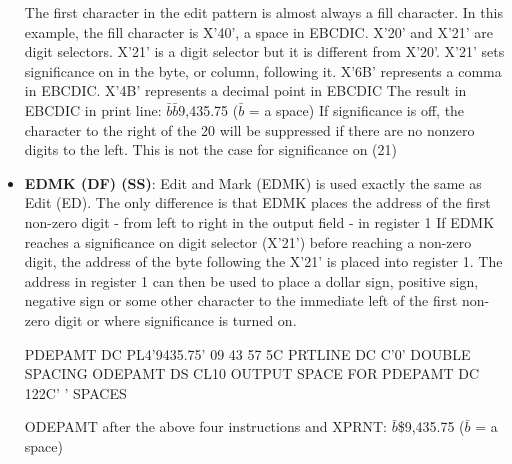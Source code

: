 \documentclass{report}
\begin{document}
\begin{itemize}
            \bigbreak \noindent 
            The first character in the edit pattern is almost always a fill character.
            \bigbreak \noindent 
            In this example, the fill character is X'40', a space in EBCDIC.
            \bigbreak \noindent 
            X'20' and X'21' are digit selectors.
            \bigbreak \noindent 
            X'21' is a digit selector but it is different from X'20'.
            \bigbreak \noindent 
            X'21' sets significance on in the byte, or column, following it.
            \bigbreak \noindent 
            X'6B' represents a comma in EBCDIC.
            \bigbreak \noindent 
            X'4B' represents a decimal point in EBCDIC
            \bigbreak \noindent 
            The result in EBCDIC in print line: $\bar{b}\bar{b}$9,435.75 ($\bar{b} $ = a space)
            \bigbreak \noindent 
            If significance is off, the character to the right of the 20 will be suppressed if there are no nonzero digits to the left. This is not the case for significance on (21)
        \item \textbf{EDMK (DF) (SS)}: Edit and Mark (EDMK) is used exactly the same as Edit (ED). The only difference is that EDMK places the address of the first
            non-zero digit - from left to right in the output field - in register 1
            \bigbreak \noindent 
            If EDMK reaches a significance on digit selector (X'21') before
            reaching a non-zero digit, the address of the byte following the X'21'
            is placed into register 1.
            \bigbreak \noindent 
            The address in register 1 can then be used to place a dollar sign,
            positive sign, negative sign or some other character to the immediate
            left of the first non-zero digit or where significance is turned on.
            \bigbreak \noindent 
            \bigbreak \noindent 
            \begin{cppcode}
                PDEPAMT DC PL4'9435.75' 09 43 57 5C
                PRTLINE DC C'0' DOUBLE SPACING
                ODEPAMT DS CL10 OUTPUT SPACE FOR PDEPAMT
                DC 122C' ' SPACES
            \end{cppcode}
            \bigbreak \noindent 
            ODEPAMT after the above four instructions and XPRNT: $\bar{b}$\$9,435.75 ($\bar{b}$ = a space)

\end{itemize}
\end{document}
